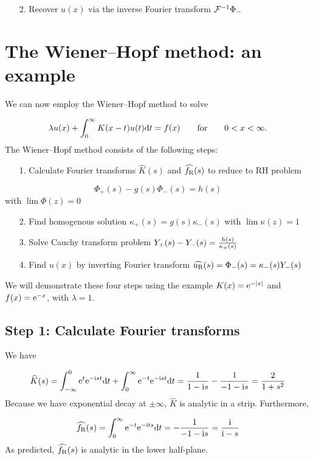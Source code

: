\documentclass[12pt,landscape]{article}
\def\qqfor{\qquad\hbox{for}\qquad}
\def\D{ {\rm d} }
\def\I{ {\rm i} }
\def\E{ {\rm e} }
\def\fR{ f_{\rm R} }
\def\dt{\D t}
\def\endash{–}
\begin{document}
{\begin{itemize}
\item[2. ] Recover $u(x)$ via the inverse Fourier transform ${\cal F}^{-1} \Phi_-$

\end{itemize}
\section{The Wiener\ensuremath{\endash}Hopf method: an example}
We can now employ the Wiener\ensuremath{\endash}Hopf method to solve

\[
\lambda u(x) + \int_{0}^\infty K(x-t)u(t) \dt = f(x)\qqfor 0 < x < \infty.
\]
The Wiener\ensuremath{\endash}Hopf method consists of the following steps:

\begin{itemize}
\item[1. ] Calculate Fourier transforms $\widehat K(s)$ and $\widehat{f_{\rm R}}(s)$ to reduce to RH problem

\end{itemize}
\[
\Phi_+(s) -g(s) \Phi_-(s) = h(s)
\]
with $\lim \Phi(z) = 0$

\begin{itemize}
\item[2. ] Find homogenous solution $\kappa_+(s) = g(s) \kappa_-(s)$ with $\lim \kappa(z) = 1$


\item[3. ] Solve Cauchy transform problem $Y_+(s) - Y_-(s) = {h(s) \over \kappa_+(s)}$


\item[4. ] Find $u(x)$ by inverting Fourier transform $\widehat{u_{\rm R}}(s) = \Phi_-(s) = \kappa_-(s) Y_-(s)$

\end{itemize}
We will demonstrate these four steps using the example $K(x) = \E^{-|x|}$ and $f(x) = \E^{-x}$, with $\lambda = 1$.

\subsection{Step 1: Calculate Fourier transforms}
We have

\[
\widehat{K}(s) = \int_{-\infty}^0 \E^{t}\E^{-\I s t} \dt + \int_0^\infty \E^{-t} \E^{-\I s t} \dt =
 {1 \over 1-\I s} - {1 \over -1-\I s} = {2 \over 1+s^2}
\]
Because we have exponential decay at $\pm \infty$, $\widehat{K}$ is analytic in a strip. Furthermore,

\[
\widehat{f_{\rm R}}(s) = \int_0^\infty \E^{-t} \E^{-\I t s} \dt = -{1 \over -1-\I s} = {\I \over \I-s}
\]
As predicted, $\widehat{\fR}(s)$ is analytic in the lower half-plane.

}
\end{document}
